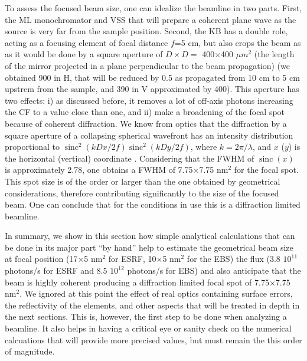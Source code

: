 \documentclass{iucr}              %
\newcommand{\inred}[1]{{\color{red}#1}}
\DeclareMathOperator{\sinc}{sinc}
\begin{document}
To assess the focused beam size, one can idealize the beamline in two parts. First, the ML monochromator and VSS that will prepare a coherent plane wave as the source is very far from the sample position. Second, the KB has a double role, acting as a focusing element of focal distance $f$=5 cm, but also crops the beam as as it would be done by a square aperture of $D \times D=$ 400$\times$400 $\mu m^2$ (the length of the mirror projected in a plane perpendicular to the beam propagation) \inred{(we obtained 900 in H, that will be reduced by 0.5 as propagated from 10 cm to 5 cm upstrem from the sample, and 390 in V approximated by 400)}. This aperture has two effects: i) as discussed before, it removes a lot of off-axis photons increasing the CF to a value close than one, and ii) make a broadening of the focal spot because of coherent diffraction. We know from optics that the diffraction by a square aperture of a collapsing spherical wavefront has an intensity distribution proportional to $\sinc^2(k D x/2 f) \sinc^2(k D y / 2 f)$, where $k=2\pi/\lambda$, and $x$ ($y$) is the horizontal (vertical) coordinate . Considering that the FWHM of $\sinc(x)$ is approximately 2.78, one obtains a FWHM of 7.75$\times$7.75 nm$^2$ for the focal spot. This spot size is of the order or larger than the one obtained by geometrical considerations, therefore contributing significantly to the size of the focused beam. One can conclude that for the conditions in use this is a diffraction limited beamline. 


In summary, we show in this section how simple analytical calculations that can be done in its major part ``by hand'' help to estimate the geometrical beam size at focal position (17$\times$5 nm$^2$ for ESRF, 10$\times$5 nm$^2$ for the EBS) the flux (3.8 $10^{11}$ photons/s for ESRF and 8.5 $10^{12}$ photons/s for EBS) and also anticipate that the beam is highly coherent producing a diffraction limited focal spot of  7.75$\times$7.75 nm$^2$. We ignored at this point the effect of real optics containing surface errors, the reflectivity of the elements, and other aspects that will be treated in depth in the next sections. This is, however, the first step to be done when analyzing a beamline. It also helps in having a critical eye or sanity check on the numerical calcuations that will provide more precised values, but must remain the this order of magnitude.  


\end{document}
